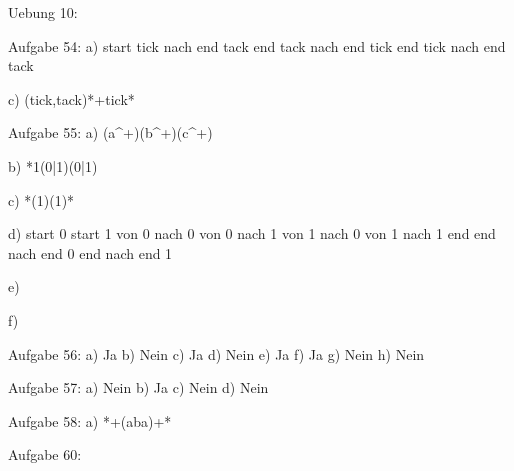 Uebung 10:

Aufgabe 54:
a)
start tick nach end tack
end tack nach end tick
end tick nach end tack

c)
(tick,tack)*+tick*


Aufgabe 55:
a)
(a^+)(b^+)(c^+)

b)
*1(0|1)(0|1)

c)
*(1)(1)*

d)
start 0
start 1
von 0 nach 0
von 0 nach 1
von 1 nach 0
von 1 nach 1 end
end nach end 0
end nach end 1

e)

f)


Aufgabe 56:
a) Ja
b) Nein
c) Ja
d) Nein
e) Ja
f) Ja
g) Nein
h) Nein


Aufgabe 57:
a) Nein
b) Ja
c) Nein
d) Nein


Aufgabe 58:
a) *+(aba)+*


Aufgabe 60: